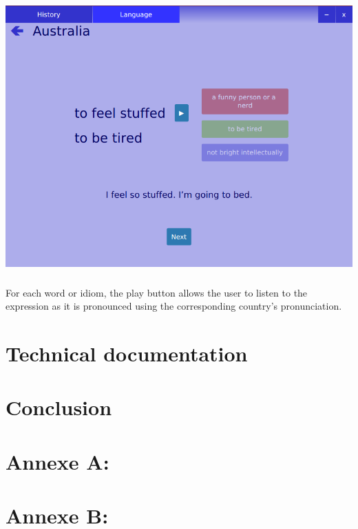 \documentclass[11pt, a4paper]{report}
\begin{document}
\vspace{0.08cm}
\centerline{\includegraphics[scale=0.5]{images/AustraliaWrongAnswer.png}}

\paragraph{}For each word or idiom, the play button allows the user to listen to the expression as it is pronounced using the corresponding country's pronunciation.


\chapter*{Technical documentation}


\chapter*{Conclusion}



\newpage

\appendix
\chapter*{Annexe A: }

\newpage

\chapter*{Annexe B: }
\end{document}
